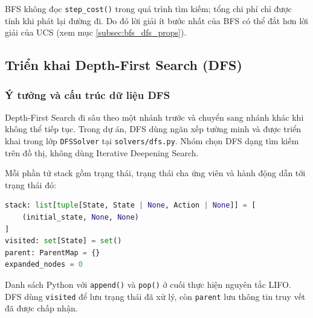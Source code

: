 BFS không đọc \texttt{step\_cost()} trong quá trình tìm kiếm; tổng chi phí chỉ được tính khi phát lại đường đi. Do đó lời giải ít bước nhất của BFS có thể đắt hơn lời giải của UCS (xem mục \ref{subsec:bfs_dfs_props}).

\subsection{Triển khai Depth-First Search (DFS)}

\subsubsection{Ý tưởng và cấu trúc dữ liệu DFS}
Depth-First Search đi sâu theo một nhánh trước và chuyển sang nhánh khác khi không thể tiếp tục. Trong dự án, DFS dùng ngăn xếp tường minh và được triển khai trong lớp \texttt{DFSSolver} tại \texttt{solvers/dfs.py}. Nhóm chọn DFS dạng tìm kiếm trên đồ thị, không dùng Iterative Deepening Search.

Mỗi phần tử stack gồm trạng thái, trạng thái cha ứng viên và hành động dẫn tới trạng thái đó:
\begin{lstlisting}[language=Python]
stack: list[tuple[State, State | None, Action | None]] = [
    (initial_state, None, None)
]
visited: set[State] = set()
parent: ParentMap = {}
expanded_nodes = 0
\end{lstlisting}
Danh sách Python với \texttt{append()} và \texttt{pop()} ở cuối thực hiện nguyên tắc LIFO. DFS dùng \texttt{visited} để lưu trạng thái đã xử lý, còn \texttt{parent} lưu thông tin truy vết đã được chấp nhận.

